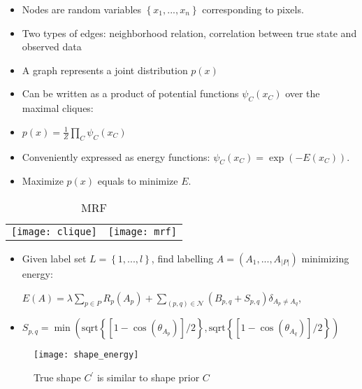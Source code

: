 \documentclass[11pt, a4paper, landscape]{article}
\begin{document}
\NewPage{}
\vfill
\begin{itemize}
\item Nodes are random variables $\left\lbrace x_1, ..., x_n \right\rbrace $ corresponding to pixels.
\item Two types of edges: neighborhood relation, correlation between true state and observed data
\item A graph represents a joint distribution $p(x)$
\item Can be written as a product of potential functions $\psi_C(x_C)$ over the maximal cliques:
\item[]
	\begin{center}
		$p(x) = \frac{1}{Z} \prod\limits_{C}\psi_C(x_C)$
	\end{center}
\item Conveniently expressed as energy functions: $\psi_C(x_C) = \exp(-E(x_C))$.
\item Maximize $p(x)$ equals to minimize $E$.
\end{itemize}
\begin{table}
  \centering
  \begin{tabular}{@{} M{.5\linewidth} M{.5\linewidth} @{}}
      \texttt{[image: clique]}%
      \caption{Cliques}%
      &
      \texttt{[image: mrf]}%
      \caption{MRF}%
  \end{tabular}
\end{table}
\vfill


\NewPage{}
\vfill
\begin{itemize}
\item Given label set $L = \left\lbrace 1, ..., l \right\rbrace $, find labelling $A = (A_1, ..., A_{\lvert P \rvert})$ minimizing energy:
\begin{center}
$E(A) = \lambda \sum\limits_{p \in P} R_p(A_p) + \sum\limits_{(p, q) \in \mathcal{N}} (B_{p, q} + S_{p, q})\delta_{A_p \neq A_q}$,
\end{center}
\item[]
\begin{center}
$S_{p, q} = \min(\mathrm{sqrt}\left\lbrace [1 - \cos(\theta_{A_p})]/2 \right\rbrace, \mathrm{sqrt}\left\lbrace [1 - \cos(\theta_{A_q})]/2 \right\rbrace )$
\end{center}
\end{itemize}
\begin{figure}
	\centering
	\texttt{[image: shape\_energy]}
	\caption{True shape $C^{\prime}$ is similar to shape prior $C$}
\end{figure}
\vfill
\end{document}
